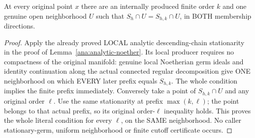 \begin{theorem}
\label{hir:actual-ambient-hs-whole-prefix-local-stationarity}
\leanok
At every original point $x$ there are an internally produced finite order
$k$ and one genuine open neighborhood $U$ such that
$S_h\cap U=S_{h,k}\cap U$, in BOTH membership directions.
\end{theorem}
\begin{proof}
Apply the already proved LOCAL analytic descending-chain stationarity in
the proof of Lemma~\ref{ana:analytic-noether}. Its local producer requires
no compactness of the original manifold: genuine local Noetherian germ
ideals and identity continuation along the actual connected regular
decomposition give ONE neighborhood on which EVERY later prefix equals
$S_{h,k}$. The whole condition implies the finite prefix immediately.
Conversely take a point of $S_{h,k}\cap U$ and any original order $\ell$.
Use the same stationarity at prefix $\max(k,\ell)$; the point belongs to
that actual prefix, so its original order-$\ell$ inequality holds.
This proves the whole literal condition for every $\ell$, on the SAME
neighborhood. No caller stationary-germ, uniform neighborhood or finite
cutoff certificate occurs.
\end{proof}

